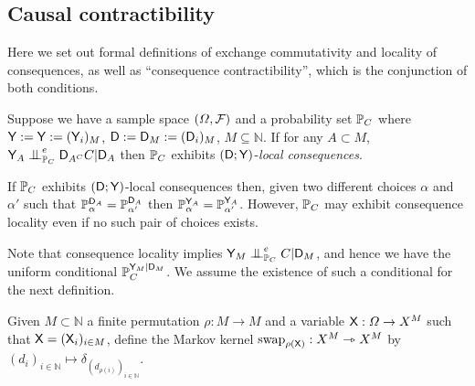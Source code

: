 



\subsection{Causal contractibility}\label{sec:ccontracibility}

Here we set out formal definitions of exchange commutativity and locality of consequences, as well as ``consequence contractibility'', which is the conjunction of both conditions.

\begin{definition}\label{def:caus_cont}
Suppose we have a sample space $(\Omega,\mathcal{F})$ and a probability set $\mathbb{P}_C$  where $\mathsf{Y}:=\mathsf{Y}:=(\mathsf{Y}_i)_{M}$, $\mathsf{D}:=\mathsf{D}_M:=(\mathsf{D}_i)_M$, $M\subseteq \mathbb{N}$. If for any $A\subset M$, $\RV{Y}_A\CI^e_{\prob{P}_C} \RV{D}_{A^C} C |\RV{D}_A$ then $\mathbb{P}_C$ exhibits $(\mathsf{D};\mathsf{Y})$-\emph{local consequences}.
\end{definition}

If $\mathbb{P}_C$ exhibits $(\mathsf{D};\mathsf{Y})$-local consequences then, given two different choices $\alpha$ and $\alpha'$ such that $\mathbb{P}_\alpha^{\mathsf{D}_A}=\mathbb{P}_{\alpha'}^{\mathsf{D}_A}$ then $\mathbb{P}_\alpha^{\mathsf{Y}_A}=\mathbb{P}_{\alpha'}^{\mathsf{Y}_A}$. However, $\mathbb{P}_C$ may exhibit consequence locality even if no such pair of choices exists.

Note that consequence locality implies $\RV{Y}_M \CI^e_{\prob{P}_C} C |\RV{D}_M$, and hence we have the uniform conditional $\mathbb{P}_C^{\mathsf{Y}_M|\mathsf{D}_M}$. We assume the existence of such a conditional for the next definition.

\begin{definition}
Given $M\subset \mathbb{N}$ a finite permutation $\rho:M\to M$ and a variable $\mathsf{X}:\Omega\to X^M$ such that $\mathsf{X}=(\mathsf{X}_i)_{i\in M}$, define the Markov kernel $\text{swap}_{\rho(\mathsf{X})}:X^M\rightarrowtriangle X^M$ by $(d_i)_{i\in\mathbb{N}}\mapsto \delta_{(d_{\rho(i)})_{i\in\mathbb{N}}}$.
\end{definition}

